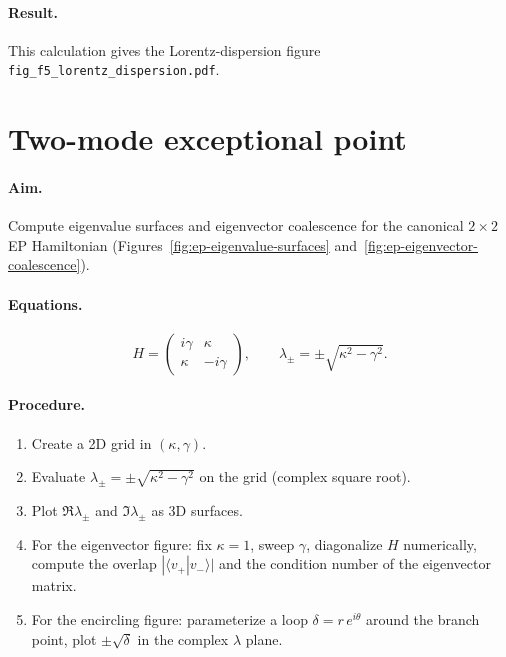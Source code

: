 \paragraph{Result.}
This calculation gives the Lorentz-dispersion figure
\texttt{fig\_f5\_lorentz\_dispersion.pdf}.


\section{Two-mode exceptional point}
\label{sec:recipe-ep}

\paragraph{Aim.}
Compute eigenvalue surfaces and eigenvector coalescence for the
canonical $2\times 2$ EP Hamiltonian
(Figures~\ref{fig:ep-eigenvalue-surfaces}
and~\ref{fig:ep-eigenvector-coalescence}).

\paragraph{Equations.}
\begin{equation}
 H = \begin{pmatrix} i\gamma & \kappa \\ \kappa & -i\gamma
 \end{pmatrix}, \qquad
 \lambda_\pm = \pm\sqrt{\kappa^2 - \gamma^2}.
 \label{eq:recipe-ep}
\end{equation}

\paragraph{Procedure.}
\begin{enumerate}
 \item Create a 2D grid in $(\kappa, \gamma)$.
 \item Evaluate $\lambda_\pm = \pm\sqrt{\kappa^2 - \gamma^2}$ on the
 grid (complex square root).
 \item Plot $\Re\lambda_\pm$ and $\Im\lambda_\pm$ as 3D surfaces.
 \item For the eigenvector figure: fix $\kappa = 1$, sweep $\gamma$,
 diagonalize $H$ numerically, compute the overlap
 $|\langle v_+|v_-\rangle|$ and the condition number of the
 eigenvector matrix.
 \item For the encircling figure: parameterize a loop
 $\delta = r\,e^{i\theta}$ around the branch point, plot
 $\pm\sqrt{\delta}$ in the complex $\lambda$ plane.
\end{enumerate}

